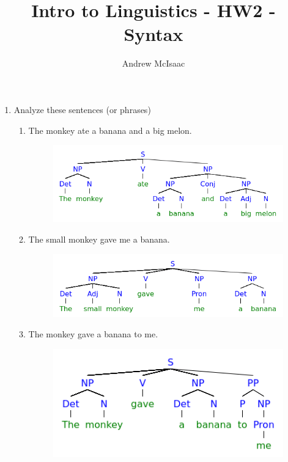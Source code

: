 \documentclass{article}
\title{Intro to Linguistics - HW2 - Syntax}
\author{Andrew McIsaac}
\begin{document}
\maketitle

\begin{enumerate}
	\item{Analyze these sentences (or phrases)}
		\begin{enumerate}
			\item{The monkey ate a banana and a big melon.}
				\begin{figure}[H]
					\includegraphics[width=\linewidth]{1a.png}
					\label{fig:1a}
				\end{figure}
			\item{The small monkey gave me a banana.}
				\begin{figure}[H]
					\includegraphics[width=\linewidth]{1b.png}
					\label{fig:1b}
				\end{figure}
			\item{The monkey gave a banana to me.}
				\begin{figure}[H]
					\includegraphics[width=\linewidth]{1c.png}

\end{figure}
\end{enumerate}
\end{enumerate}
\end{document}
